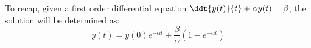 To recap, given a first order differential equation $\ddt{y(t)}{t} + \alpha y(t) = \beta$, the solution will be determined as:
\begin{equation} \label{eq:nhs}
    y(t) = y(0) e^{-\alpha t} + \frac{\beta}{\alpha} (1 - e^{-\alpha t})
\end{equation}







